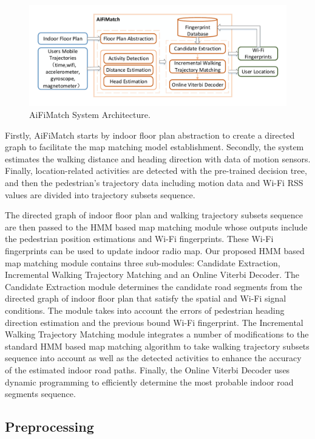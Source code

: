 \documentclass{llncs}
\begin{document}
\begin{figure}[!htbp]
	\vspace{-15pt}
	\centering
	\includegraphics[width=4.65in]{AiFiMatch-Architecture}
	\caption{AiFiMatch System Architecture.}
	\label{fig-architecture}
	\vspace{-15pt}
\end{figure}

Firstly, AiFiMatch starts by indoor floor plan abstraction to create a directed graph to facilitate the map matching model establishment. Secondly, the system estimates the walking distance and heading direction with data of motion sensors. Finally, location-related activities are detected with the pre-trained decision tree, and then the pedestrian's trajectory data including motion data and Wi-Fi RSS values are divided into trajectory subsets sequence.  

The directed graph of indoor floor plan and walking trajectory subsets sequence are then passed to the HMM based map matching module whose outputs include the pedestrian position estimations and Wi-Fi fingerprints. These Wi-Fi fingerprints can be used to update indoor radio map. Our proposed HMM based map matching module contains three sub-modules: Candidate Extraction, Incremental Walking Trajectory Matching and an Online Viterbi Decoder. The Candidate Extraction module determines the candidate road segments from the directed graph of indoor floor plan that satisfy the spatial and Wi-Fi signal conditions. The module takes into account the errors of pedestrian heading direction estimation and the previous bound Wi-Fi fingerprint. The Incremental Walking Trajectory Matching module integrates a number of modifications to the standard HMM based map matching algorithm to take walking trajectory subsets sequence into account as well as the detected activities to enhance the accuracy of the estimated indoor road paths. Finally, the Online Viterbi Decoder uses dynamic programming to efficiently determine the most probable indoor road segments sequence.

\subsection{Preprocessing}
\end{document}

